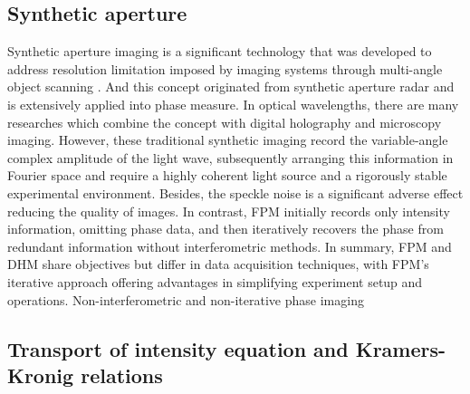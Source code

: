 \documentclass[journal,review,submit,pdftex,moreauthors]{Definitions/mdpi}
\begin{document}
\subsection{Synthetic aperture}
Synthetic aperture imaging is a significant technology that was developed to address resolution limitation imposed by imaging systems through multi-angle object scanning \cite{turpin1995theory, holloway2017savi}. And this concept originated from synthetic aperture radar \cite{ curlander1991synthetic} and is extensively applied into phase measure. In optical wavelengths, there are many researches which combine the concept with digital holography and microscopy imaging\cite { schwarz2003imaging, alexandrov2006synthetic, mico2006synthetic, kreis2007resolution, di2008high,hillman2009high, tippie2011high, mico2019resolution}. However, these traditional synthetic imaging record the variable-angle complex amplitude of the light wave, subsequently arranging this information in Fourier space and require a highly coherent light source and a rigorously stable experimental environment. Besides, the speckle noise is a significant adverse effect reducing the quality of images. In contrast, FPM initially records only intensity information, omitting phase data, and then iteratively recovers the phase from redundant information without interferometric methods. In summary, FPM and DHM share objectives but differ in data acquisition techniques, with FPM's iterative approach offering advantages in simplifying experiment setup and operations.
Non-interferometric and non-iterative phase imaging


\subsection{Transport of intensity equation and Kramers-Kronig relations}
\end{document}
